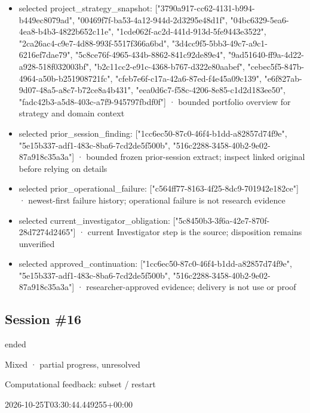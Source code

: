\documentclass[11pt]{article}
\begin{document}
\begin{itemize}
\item selected project\_strategy\_snapshot: ["3790a917-cc62-4131-b994-b449ec8079ad", "00469f7f-ba53-4a12-944d-2d3295e48d1f", "04bc6329-5ea6-4ea8-b4b3-4822b652c11e", "1cde062f-ac2d-441d-913d-5fe9443e3522", "2ca26ac4-c9e7-4d88-993f-5517f366a6bd", "3d4cc9f5-5bb3-49c7-a9c1-6216ef7dae79", "5c8ce76f-4965-434b-8862-841c92de89e4", "9ad51640-ff9a-4d22-a928-518f032003bf", "b2c11cc2-e91c-4368-b767-d322e80aabef", "cebec5f5-847b-4964-a50b-b251908721fc", "cfeb7e6f-c17a-42a6-87ed-f4e45a09c139", "e6f827ab-9d07-48a5-a8c7-b72ce8a4b431", "eea0d6c7-f58c-4206-8e85-c1d2d183ee50", "fadc42b3-a5d8-403c-a7f9-945797fbdf0f"] · bounded portfolio overview for strategy and domain context
\item selected prior\_session\_finding: ["1cc6ec50-87c0-46f4-b1dd-a82857d74f9e", "5e15b337-adf1-483c-8ba6-7cd2de5f500b", "516c2288-3458-40b2-9e02-87a918c35a3a"] · bounded frozen prior-session extract; inspect linked original before relying on details
\item selected prior\_operational\_failure: ["c564ff77-8163-4f25-8dc9-701942e182ce"] · newest-first failure history; operational failure is not research evidence
\item selected current\_investigator\_obligation: ["5c8450b3-3f6a-42e7-870f-28d7274d2465"] · current Investigator step is the source; disposition remains unverified
\item selected approved\_continuation: ["1cc6ec50-87c0-46f4-b1dd-a82857d74f9e", "5e15b337-adf1-483c-8ba6-7cd2de5f500b", "516c2288-3458-40b2-9e02-87a918c35a3a"] · researcher-approved evidence; delivery is not use or proof
\end{itemize}
\subsection{Session \#16}
\begin{description}[style=nextline,font=\normalfont\bfseries,leftmargin=0pt,labelsep=0pt]
\item[Execution status] ended
\item[Outcome] Mixed · partial progress, unresolved
\item[Strategy] Computational feedback: subset / restart
\item[Started] 2026-10-25T03:30:44.449255+00:00
\end{description}
\end{document}

